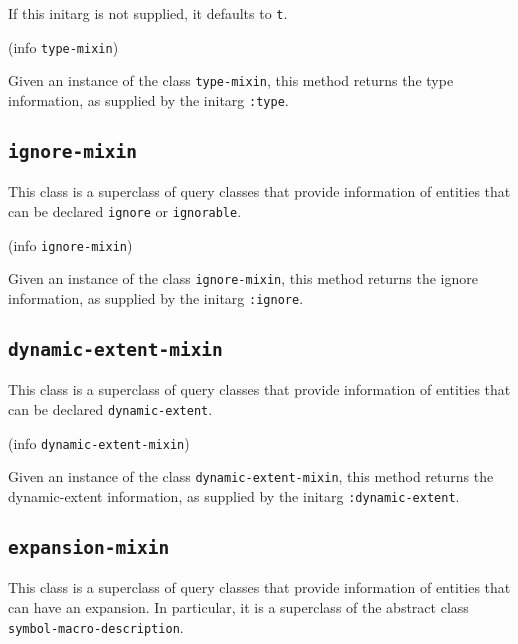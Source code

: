 
If this initarg is not supplied, it defaults to \texttt{t}.

 {(info {\tt type-mixin})}

Given an instance of the class \texttt{type-mixin}, this method
returns the type information, as supplied by the initarg
\texttt{:type}.

\subsection{\texttt{ignore-mixin}}
\label{sec-ignore-mixin}


This class is a superclass of query classes that provide information
of entities that can be declared \texttt{ignore} or \texttt{ignorable}.


 {(info {\tt ignore-mixin})}

Given an instance of the class \texttt{ignore-mixin}, this method
returns the ignore information, as supplied by the initarg
\texttt{:ignore}.

\subsection{\texttt{dynamic-extent-mixin}}
\label{sec-dynamic-extent-mixin}


This class is a superclass of query classes that provide information
of entities that can be declared \texttt{dynamic-extent}.


 {(info {\tt dynamic-extent-mixin})}

Given an instance of the class \texttt{dynamic-extent-mixin}, this method
returns the dynamic-extent information, as supplied by the initarg
\texttt{:dynamic-extent}.

\subsection{\texttt{expansion-mixin}}
\label{sec-expansion-mixin}

This class is a superclass of query classes that provide information
of entities that can have an expansion.  In particular, it is a
superclass of the abstract class \texttt{symbol-macro-description}.

